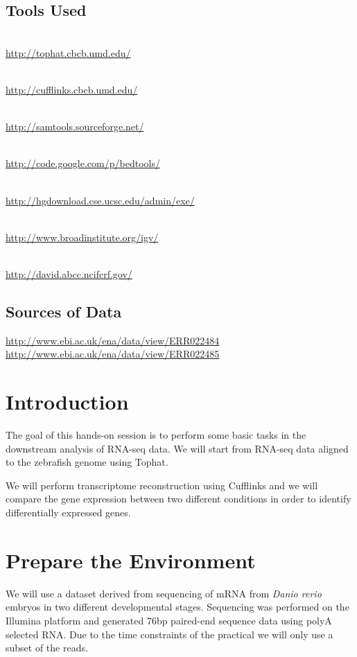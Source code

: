 \subsection{Tools Used}
\begin{description}[style=multiline,labelindent=0cm,align=left,leftmargin=1cm]
  \item[Tophat] \hfill\\
    \url{http://tophat.cbcb.umd.edu/}
  \item[Cufflinks] \hfill\\
    \url{http://cufflinks.cbcb.umd.edu/}
  \item[Samtools] \hfill\\
    \url{http://samtools.sourceforge.net/}
  \item[BEDTools] \hfill\\
    \url{http://code.google.com/p/bedtools/}
  \item[UCSC tools] \hfill\\
    \url{http://hgdownload.cse.ucsc.edu/admin/exe/}
  \item[IGV] \hfill\\
    \url{http://www.broadinstitute.org/igv/}
  \item[DAVID Functional Analysis] \hfill\\
    \url{http://david.abcc.ncifcrf.gov/}
\end{description}

\subsection{Sources of Data}
\url{http://www.ebi.ac.uk/ena/data/view/ERR022484}\\
\url{http://www.ebi.ac.uk/ena/data/view/ERR022485}

\newpage

\section{Introduction}
The goal of this hands-on session is to perform some basic tasks in the
downstream analysis of RNA-seq data. We will start from RNA-seq data aligned to
the zebrafish genome using Tophat.

We will perform transcriptome reconstruction using Cufflinks and we will compare
the gene expression between two different conditions in order to identify
differentially expressed genes.

\section{Prepare the Environment}
We will use a dataset derived from sequencing of mRNA from \textit{Danio rerio} embryos
in two different developmental stages. Sequencing was performed on the Illumina
platform and generated 76bp paired-end sequence data using polyA selected RNA.
Due to the time constraints of the practical we will only use a subset of the
reads.

